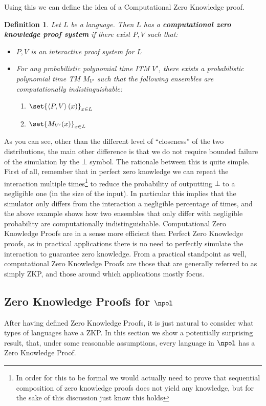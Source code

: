 \documentclass{article}
\newtheorem{definition}{Definition}
\begin{document}
Using this we can define the idea of a Computational Zero Knowledge proof.
\begin{definition}
    Let $L$ be a language. Then $L$ has a \textbf{computational zero knowledge proof system} if there exist $P, V$ such that:
    \begin{itemize}
        \item $P, V$ is an interactive proof system for $L$
        \item For any probabilistic polynomial time ITM $V'$, there exists a probabilistic polynomial time TM $M_{V'}$ such that the following ensembles are computationally indistinguishable:
              \begin{enumerate}
                  \item $\set{ \left<P, V \right>(x) }_{x \in L}$
                  \item $\set{ M_{V'}(x) }_{x \in L}$
              \end{enumerate}

    \end{itemize}
\end{definition}
As you can see, other than the different level of \enquote{closeness} of the two distributions, the main other difference is that we do not require bounded failure of the simulation by the $\bot$ symbol. The rationale between this is quite simple. First of all, remember that in perfect zero knowledge we can repeat the interaction multiple times\footnote{In order for this to be formal we would actually need to prove that sequential composition of zero knowledge proofs does not yield any knowledge, but for the sake of this discussion just know this holds} to reduce the probability of outputting $\bot$ to a negligible one (in the size of the input). In particular this implies that the simulator only differs from the interaction a negligible percentage of times, and the above example shows how two ensembles that only differ with negligible probability are computationally indistinguishable. Computational Zero Knowledge Proofs are in a sense more efficient then Perfect Zero Knowledge proofs, as in practical applications there is no need to perfectly simulate the interaction to guarantee zero knowledge.
From a practical standpoint as well, computational Zero Knowledge Proofs are those that are generally referred to as simply ZKP, and those around which applications mostly focus.



\subsection{Zero Knowledge Proofs for \texorpdfstring{$\npol$}{NP}}
After having defined Zero Knowledge Proofs, it is just natural to consider what types of languages have
a ZKP. In this section we show a potentially surprising result, that, under some reasonable assumptions, every language in $\npol$ has
a Zero Knowledge Proof.
\end{document}
